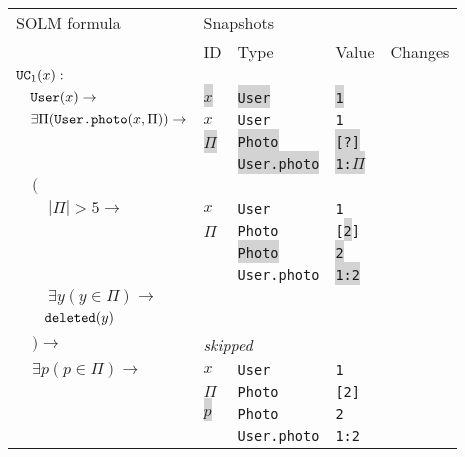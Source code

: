 \documentclass{article}
\begin{document}
    \begin{tabular}[t]{l|llll}
        SOLM formula & \multicolumn{4}{l}{Snapshots} \\
        & ID & Type & Value & Changes \\
        \hline

        $\mbox{\texttt{UC}}_1(x) : $ \\
        $\quad \mbox{\texttt{User}}(x) \to$ 
            & \colorbox{lightgray}{$x$} & \colorbox{lightgray}{\texttt{User}} & \colorbox{lightgray}{\texttt{1}} \\
        
        \hline
        $\quad \exists \Pi(\mbox{\texttt{User.photo}}(x, \Pi)) \to$ 
            & $x$ & \texttt{User} & \texttt{1} \\
            & \colorbox{lightgray}{$\Pi$} & \colorbox{lightgray}{\texttt{Photo}} & \colorbox{lightgray}{\texttt{[?]}} \\
            &  & \colorbox{lightgray}{\texttt{User.photo}} & \colorbox{lightgray}{\texttt{1:$\Pi$}} \\
        
        \hline
        $\quad ($ \\
        $\quad\quad |\Pi| > 5 \to$ 
            & $x$ & \texttt{User} & \texttt{1} \\
            & $\Pi$ & \texttt{Photo} & \texttt{[\colorbox{lightgray}{2}]} \\
            &  & \colorbox{lightgray}{\texttt{Photo}} & \colorbox{lightgray}{\texttt{2}} \\
            & & \texttt{User.photo} & \colorbox{lightgray}{\texttt{1:2}} \\
            
        \hline
        $\quad\quad \exists y(y \in \Pi) \to$ \\
        $\quad\quad \mbox{\texttt{deleted}}(y) $ \\
        $\quad ) \to$
            & \multicolumn{4}{l}{\textit{skipped}} \\
            
        \hline
        $\quad \exists p(p \in \Pi) \to$ 
            & $x$ & \texttt{User} & \texttt{1} \\
            & $\Pi$ & \texttt{Photo} & \texttt{[2]} \\
            & \colorbox{lightgray}{$p$} & \texttt{Photo} & \texttt{2} \\
            &  & \texttt{User.photo} & \texttt{1:2} \\
            

\end{tabular}
\end{document}
